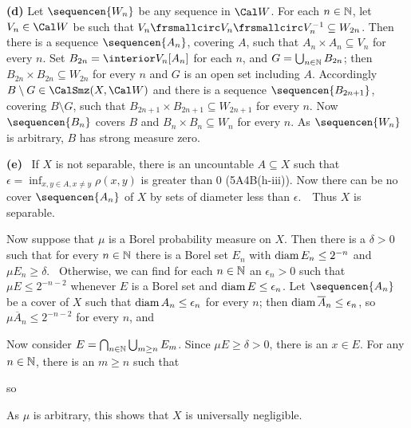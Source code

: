 {\medskip

{\bf (d)} Let $\sequencen{W_n}$ be any sequence in $\Cal W$.   For each
$n\in\Bbb N$, let $V_n\in\Cal W$ be such that
$V_n\frsmallcirc V_n\frsmallcirc V_n^{-1}\subseteq W_{2n}$.   Then there
is a sequence $\sequencen{A_n}$, covering $A$, such that
$A_n\times A_n\subseteq V_n$ for every $n$.   Set
$B_{2n}=\interior V_n[A_n]$ for
each $n$, and $G=\bigcup_{n\in\Bbb N}B_{2n}$;  then
$B_{2n}\times B_{2n}\subseteq W_{2n}$ for every $n$ and $G$ is an open
set including $A$.   Accordingly $B\setminus G\in\CalSmz(X,\Cal W)$
and there is a sequence $\sequencen{B_{2n+1}}$, covering $B\setminus G$,
such that $B_{2n+1}\times B_{2n+1}\subseteq W_{2n+1}$ for every $n$.
Now $\sequencen{B_n}$ covers $B$ and $B_n\times B_n\subseteq W_n$ for
every $n$.   As $\sequencen{W_n}$ is arbitrary, $B$ has strong measure
zero.

\medskip

{\bf (e)} \Quer\ If $X$ is not separable, there is an uncountable
$A\subseteq X$ such that $\epsilon=\inf_{x,y\in A,x\ne y}\rho(x,y)$ is
greater than $0$ (5A4B(h-iii)).
Now there can be no cover $\sequencen{A_n}$ of $X$ by sets of
diameter less than $\epsilon$.\ \BanG\ Thus $X$ is separable.

Now suppose that $\mu$ is a Borel probability measure on $X$.   Then
there is a $\delta>0$ such that for every $n\in\Bbb N$ there is a
Borel
set $E_n$ with $\mathop{\text{diam}} E_n\le 2^{-n}$ and $\mu E_n\ge\delta$.
\Prf\Quer\ Otherwise, we can find for each $n\in\Bbb N$ an
$\epsilon_n>0$ such that $\mu E\le 2^{-n-2}$ whenever $E$ is a Borel
set
and $\mathop{\text{diam}} E\le\epsilon_n$.   Let $\sequencen{A_n}$ be a cover of $X$
such that $\mathop{\text{diam}} A_n\le\epsilon_n$ for every $n$;  then
$\mathop{\text{diam}}\overline{A}_n\le\epsilon_n$, so $\mu\overline{A}_n\le 2^{-n-2}$
for every $n$, and


Now consider $E=\bigcap_{n\in\Bbb N}\bigcup_{m\ge n}E_m$.   Since
$\mu E\ge\delta>0$, there is an $x\in E$.   For any $n\in\Bbb N$,
there
is an $m\ge n$ such that


\noindent so


\noindent As $\mu$ is arbitrary, this shows that $X$ is universally
negligible.

}%

